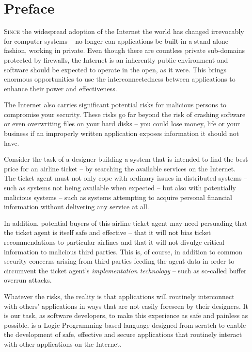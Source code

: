 \renewcommand{\chaptermark}[1]{\markboth{#1}{#1}} 
\chapter{Preface}

\lettrine[nindent=0.1em]{S}{ince} the widespread adoption of the Internet the world has changed irrevocably for computer systems -- no longer can applications be built in a stand-alone fashion, working in private. Even though there are countless private sub-domains protected by firewalls, the Internet is an inherently public environment and software should be expected to operate in the open, as it were. This brings enormous opportunities to use the interconnectedness between applications to enhance their power and effectiveness.

The Internet also carries significant potential risks for malicious persons to compromise your security. These risks go far beyond the risk of crashing software or even overwriting files on your hard disks -- you could lose money, life or your business if an improperly written application exposes information it should not have.

Consider the task of a designer building a system that is intended to find the best price for an airline ticket -- by searching the available services on the Internet. The ticket agent must not only cope with ordinary issues in distributed systems -- such as systems not being available when expected -- but also with potentially malicious systems -- such as systems attempting to acquire personal financial information without delivering any service at all.

In addition, potential buyers of this airline ticket agent may need persuading that the ticket agent is itself safe and effective -- that it will not bias ticket recommendations to particular airlines and that it will not divulge critical information to malicious third parties. This is, of course, in addition to common security concerns arising from third parties feeding the agent data in order to circumvent the ticket agent's \emph{implementation technology} -- such as so-called buffer overrun attacks.

Whatever the risks, the reality is that applications will routinely interconnect with others' applications in ways that are not easily foreseen by their designers. It is our task, as software developers, to make this experience as safe and painless as possible. \go is a Logic Programming based language designed from scratch to enable the development of safe, effective and secure applications that routinely interact with other applications on the Internet.

